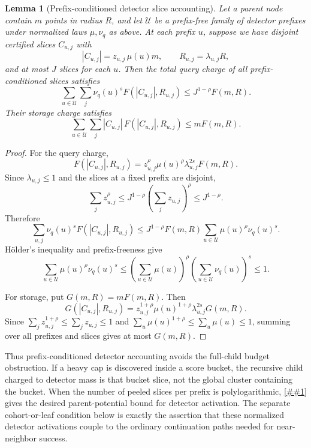 \documentclass[10pt]{article}
\newcommand{\cref}[1]{\ref{##1}}
\newtheorem{lemma}[theorem]{Lemma}
\theoremstyle{definition}
\begin{document}
\begin{lemma}[Prefix-conditioned detector slice accounting]\label{lem:prefix-slice-accounting}
   Let a parent node contain $m$ points in radius $R$, and let $\mathcal U$ be a prefix-free family of detector prefixes under normalized laws $\mu,\nu_q$ as above. At each prefix $u$, suppose we have disjoint certified slices $C_{u,j}$ with
   \[
      |C_{u,j}|=z_{u,j}\,\mu(u)m,
      \qquad
      R_{u,j}=\lambda_{u,j}R,
   \]
   and at most $J$ slices for each $u$. Then the total query charge of all prefix-conditioned slices satisfies
   \[
      \sum_{u\in\mathcal U}\sum_j
      \nu_q(u)^s F(|C_{u,j}|,R_{u,j})
      \le
      J^{1-\rho}F(m,R).
   \]
   Their storage charge satisfies
   \[
      \sum_{u\in\mathcal U}\sum_j
      |C_{u,j}|\,F(|C_{u,j}|,R_{u,j})
      \le
      mF(m,R).
   \]
\end{lemma}

\begin{proof}
   For the query charge,
   \[
      F(|C_{u,j}|,R_{u,j})
      =
      z_{u,j}^{\rho}\mu(u)^\rho\lambda_{u,j}^{2s}F(m,R).
   \]
   Since $\lambda_{u,j}\le1$ and the slices at a fixed prefix are disjoint,
   \[
      \sum_j z_{u,j}^{\rho}
      \le
      J^{1-\rho}\left(\sum_j z_{u,j}\right)^\rho
      \le
      J^{1-\rho}.
   \]
   Therefore
   \[
      \sum_{u,j}\nu_q(u)^sF(|C_{u,j}|,R_{u,j})
      \le
      J^{1-\rho}F(m,R)
      \sum_{u\in\mathcal U}\mu(u)^\rho\nu_q(u)^s.
   \]
   Hölder's inequality and prefix-freeness give
   \[
      \sum_{u\in\mathcal U}\mu(u)^\rho\nu_q(u)^s
      \le
      \left(\sum_{u\in\mathcal U}\mu(u)\right)^\rho
      \left(\sum_{u\in\mathcal U}\nu_q(u)\right)^s
      \le1.
   \]

   For storage, put $G(m,R)=mF(m,R)$. Then
   \[
      G(|C_{u,j}|,R_{u,j})
      =
      z_{u,j}^{1+\rho}\mu(u)^{1+\rho}\lambda_{u,j}^{2s}G(m,R).
   \]
   Since $\sum_j z_{u,j}^{1+\rho}\le\sum_j z_{u,j}\le1$ and $\sum_u\mu(u)^{1+\rho}\le\sum_u\mu(u)\le1$, summing over all prefixes and slices gives at most $G(m,R)$.
\end{proof}

Thus prefix-conditioned detector accounting avoids the full-child budget obstruction. If a heavy cap is discovered inside a score bucket, the recursive child charged to detector mass is that bucket slice, not the global cluster containing the bucket. When the number of peeled slices per prefix is polylogarithmic, \cref{lem:prefix-slice-accounting} gives the desired parent-potential bound for detector activation. The separate cohort-or-leaf condition below is exactly the assertion that these normalized detector activations couple to the ordinary continuation paths needed for near-neighbor success.
\end{document}
